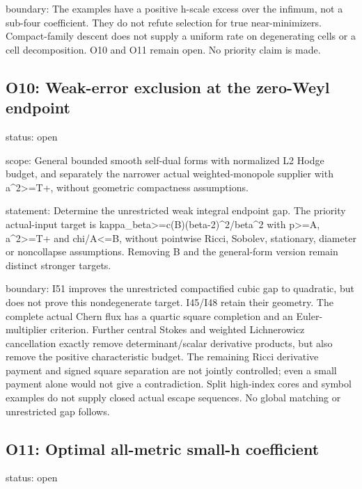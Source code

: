 \documentclass[
  10pt,
]{article}
\begin{document}
boundary: The examples have a positive h-scale excess over the infimum,
not a sub-four coefficient. They do not refute selection for true
near-minimizers. Compact-family descent does not supply a uniform rate
on degenerating cells or a cell decomposition. O10 and O11 remain open.
No priority claim is made.

\hypertarget{o10-weak-error-exclusion-at-the-zero-weyl-endpoint}{%
\subsection{O10: Weak-error exclusion at the zero-Weyl
endpoint}\label{o10-weak-error-exclusion-at-the-zero-weyl-endpoint}}

status: open

scope: General bounded smooth self-dual forms with normalized L2 Hodge
budget, and separately the narrower actual weighted-monopole supplier
with a\^{}2\textgreater=T+, without geometric compactness assumptions.

statement: Determine the unrestricted weak integral endpoint gap. The
priority actual-input target is
kappa\_beta\textgreater=c(B)(beta-2)\^{}2/beta\^{}2 with
p\textgreater=A, a\^{}2\textgreater=T+ and chi/A\textless=B, without
pointwise Ricci, Sobolev, stationary, diameter or noncollapse
assumptions. Removing B and the general-form version remain distinct
stronger targets.

boundary: I51 improves the unrestricted compactified cubic gap to
quadratic, but does not prove this nondegenerate target. I45/I48 retain
their geometry. The complete actual Chern flux has a quartic square
completion and an Euler-multiplier criterion. Further central Stokes and
weighted Lichnerowicz cancellation exactly remove determinant/scalar
derivative products, but also remove the positive characteristic budget.
The remaining Ricci derivative payment and signed square separation are
not jointly controlled; even a small payment alone would not give a
contradiction. Split high-index cores and symbol examples do not supply
closed actual escape sequences. No global matching or unrestricted gap
follows.

\hypertarget{o11-optimal-all-metric-small-h-coefficient}{%
\subsection{O11: Optimal all-metric small-h
coefficient}\label{o11-optimal-all-metric-small-h-coefficient}}

status: open
\end{document}
